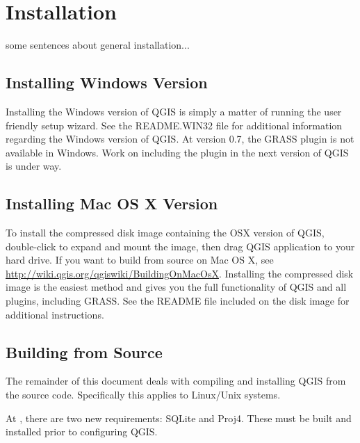
\section{Installation}\label{label_installation_source}

some sentences about general installation...

\subsection{Installing Windows Version}
Installing the Windows version of QGIS is simply a matter of running the
user friendly setup wizard. See the README.WIN32 file for additional
information regarding the Windows version of QGIS. At version 0.7, the
GRASS plugin is not available in Windows. Work on including the plugin in
the next version of QGIS is under way.


\subsection{Installing Mac OS X Version}
To install the compressed disk image containing the OSX version of QGIS,
double-click to expand and mount the image, then drag QGIS application to
your hard drive. If you want to build from source on Mac OS X, see
\url{http://wiki.qgis.org/qgiswiki/BuildingOnMacOsX}. Installing the
compressed disk image is the easiest method and gives you the full
functionality of QGIS and all plugins, including GRASS. See the README file
included on the disk image for additional instructions.


\subsection{Building from Source}\label{label_sources}

The remainder of this document deals with compiling and installing QGIS
from the source code. Specifically this applies to Linux/Unix systems.

At \CURRENT, there are two new requirements: SQLite and Proj4. These must be
built and installed prior to configuring QGIS.

